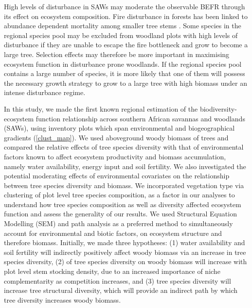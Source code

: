 \documentclass[11pt,a4paper]{article}
\begin{document}
High levels of disturbance in SAWs may moderate the observable BEFR through its effect on ecosystem composition. Fire disturbance in forests has been linked to abundance dependent mortality among smaller tree stems \citep{Roques2001, Staver2009, Bond2005}. Some species in the regional species pool may be excluded from woodland plots with high levels of disturbance if they are unable to escape the fire bottleneck and grow to become a large tree. Selection effects may therefore be more important in maximising ecosystem function in disturbance prone woodlands. If the regional species pool contains a large number of species, it is more likely that one of them will possess the necessary growth strategy to grow to a large tree with high biomass under an intense disturbance regime. 

In this study, we made the first known regional estimation of the biodiversity-ecosystem function relationship across southern African savannas and woodlands (SAWs), using inventory plots which span environmental and biogeographical gradients (\autoref{clust_map}). We used aboveground woody biomass of trees and compared the relative effects of tree species diversity with that of environmental factors known to affect ecosystem productivity and biomass accumulation, namely water availability, energy input and soil fertility. We also investigated the potential moderating effects of environmental covariates on the relationship between tree species diversity and biomass. We incorporated vegetation type via clustering of plot level tree species composition, as a factor in our analyses to understand how tree species composition as well as diversity affected ecosystem function and assess the generality of our results. We used Structural Equation Modelling (SEM) and path analysis as a preferred method to simultaneously account for environmental and biotic factors,  on ecosystem structure and therefore biomass. Initially, we made three hypotheses: (1) water availability and soil fertility will indirectly positively affect woody biomass via an increase in tree species diversity, (2)  of tree species diversity on woody biomass will increase with plot level stem stocking density, due to an increased importance of niche complementarity as competition increases, and (3) tree species diversity will increase tree structural diversity, which will provide an indirect path by which tree diversity increases woody biomass.
\end{document}
